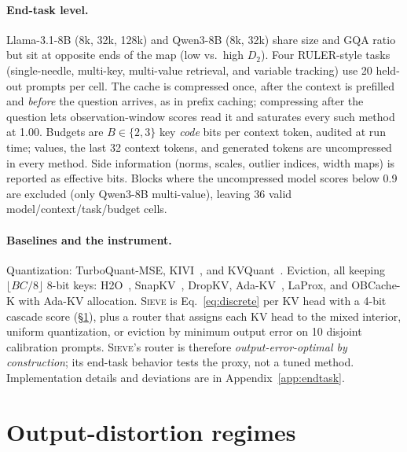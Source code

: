 \documentclass{article}
\newcommand{\sieve}{\textsc{Sieve}}
\theoremstyle{definition}
\begin{document}
\paragraph{End-task level.}
Llama-3.1-8B (8k, 32k, 128k) and Qwen3-8B (8k, 32k) share size and GQA ratio but sit at opposite ends of the map (low vs.\ high $D_2$).  Four RULER-style tasks~\citep{hsieh2024ruler} (single-needle, multi-key, multi-value retrieval, and variable tracking) use 20 held-out prompts per cell.  The cache is compressed once, after the context is prefilled and \emph{before} the question arrives, as in prefix caching; compressing after the question lets observation-window scores read it and saturates every such method at 1.00.  Budgets are $B\in\{2,3\}$ key \emph{code} bits per context token, audited at run time; values, the last 32 context tokens, and generated tokens are uncompressed in every method.  Side information (norms, scales, outlier indices, width maps) is reported as effective bits.  Blocks where the uncompressed model scores below 0.9 are excluded (only Qwen3-8B multi-value), leaving 36 valid model/context/task/budget cells.

\paragraph{Baselines and the instrument.}
Quantization: TurboQuant-MSE, KIVI~\citep{liu2024kivi}, and KVQuant~\citep{hooper2024kvquant}.  Eviction, all keeping $\lfloor BC/8\rfloor$ 8-bit keys: H2O~\citep{zhang2023h2o}, SnapKV~\citep{li2024snapkv}, DropKV, Ada-KV~\citep{feng2024adakv}, LaProx, and OBCache-K with Ada-KV allocation.  \sieve{} is Eq.~\ref{eq:discrete} per KV head with a 4-bit cascade score (\S\ref{sec:regimes}), plus a router that assigns each KV head to the mixed interior, uniform quantization, or eviction by minimum output error on 10 disjoint calibration prompts.  \sieve{}'s router is therefore \emph{output-error-optimal by construction}; its end-task behavior tests the proxy, not a tuned method.  Implementation details and deviations are in Appendix~\ref{app:endtask}.

\section{Output-distortion regimes}
\label{sec:regimes}
\end{document}
